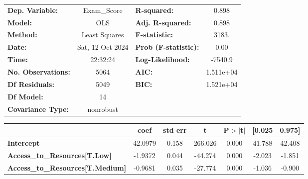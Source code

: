 \documentclass[11pt]{article}
\newcommand{\prompt}[4]{
        {\ttfamily\llap{{\color{#2}[#3]:\hspace{3pt}#4}}\vspace{-\baselineskip}}
    }
\begin{document}
            
\prompt{Out}{outcolor}{299}{}
    
    \begin{center}
\begin{tabular}{lclc}
\toprule
\textbf{Dep. Variable:}                             &   Exam\_Score    & \textbf{  R-squared:         } &     0.898   \\
\textbf{Model:}                                     &       OLS        & \textbf{  Adj. R-squared:    } &     0.898   \\
\textbf{Method:}                                    &  Least Squares   & \textbf{  F-statistic:       } &     3183.   \\
\textbf{Date:}                                      & Sat, 12 Oct 2024 & \textbf{  Prob (F-statistic):} &     0.00    \\
\textbf{Time:}                                      &     22:32:24     & \textbf{  Log-Likelihood:    } &   -7540.9   \\
\textbf{No. Observations:}                          &        5064      & \textbf{  AIC:               } & 1.511e+04   \\
\textbf{Df Residuals:}                              &        5049      & \textbf{  BIC:               } & 1.521e+04   \\
\textbf{Df Model:}                                  &          14      & \textbf{                     } &             \\
\textbf{Covariance Type:}                           &    nonrobust     & \textbf{                     } &             \\
\bottomrule
\end{tabular}
\begin{tabular}{lcccccc}
                                                    & \textbf{coef} & \textbf{std err} & \textbf{t} & \textbf{P$> |$t$|$} & \textbf{[0.025} & \textbf{0.975]}  \\
\midrule
\textbf{Intercept}                                  &      42.0979  &        0.158     &   266.026  &         0.000        &       41.788    &       42.408     \\
\textbf{Access\_to\_Resources[T.Low]}               &      -1.9372  &        0.044     &   -44.274  &         0.000        &       -2.023    &       -1.851     \\
\textbf{Access\_to\_Resources[T.Medium]}            &      -0.9681  &        0.035     &   -27.774  &         0.000        &       -1.036    &       -0.900     \\

\end{tabular}
\end{center}
\end{document}
